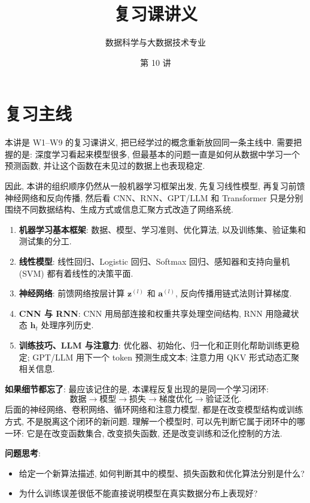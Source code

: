 \documentclass{../nndlcourse}
\begin{document}
\title{复习课讲义}
\author{数据科学与大数据技术专业}
\date{第 10 讲}
\maketitle

\section{复习主线}

本讲是 W1--W9 的复习课讲义, 把已经学过的概念重新放回同一条主线中. 需要把握的是: 深度学习看起来模型很多, 但最基本的问题一直是如何从数据中学习一个预测函数, 并让这个函数在未见过的数据上也表现稳定.

因此, 本讲的组织顺序仍然从一般机器学习框架出发, 先复习线性模型, 再复习前馈神经网络和反向传播, 然后看 CNN、RNN、GPT/LLM 和 Transformer 只是分别围绕不同数据结构、生成方式或信息汇聚方式改造了网络系统.  

\begin{enumerate}
    \item \textbf{机器学习基本框架}: 数据、模型、学习准则、优化算法, 以及训练集、验证集和测试集的分工.
    \item \textbf{线性模型}: 线性回归、Logistic 回归、Softmax 回归、感知器和支持向量机 (SVM) 都有着线性的决策平面.
    \item \textbf{神经网络}: 前馈网络按层计算 $\boldsymbol{z}^{(l)}$ 和 $\boldsymbol{a}^{(l)}$, 反向传播用链式法则计算梯度.
    \item \textbf{CNN 与 RNN}: CNN 用局部连接和权重共享处理空间结构, RNN 用隐藏状态 $\boldsymbol{h}_t$ 处理序列历史.
    \item \textbf{训练技巧、LLM 与注意力}: 优化器、初始化、归一化和正则化帮助训练更稳定; GPT/LLM 用下一个 token 预测生成文本; 注意力用 QKV 形式动态汇聚相关信息.
\end{enumerate}

\textbf{如果细节都忘了}: 最应该记住的是, 本课程反复出现的是同一个学习闭环:
\[
    \text{数据} \rightarrow \text{模型} \rightarrow \text{损失} \rightarrow \text{梯度优化} \rightarrow \text{验证泛化}.
\]
后面的神经网络、卷积网络、循环网络和注意力模型, 都是在改变模型结构或训练方式, 不是脱离这个闭环的新问题. 理解一个模型时, 可以先判断它属于闭环中的哪一环: 它是在改变函数集合, 改变损失函数, 还是改变训练和泛化控制的方法.

\textbf{问题思考}:
\begin{itemize}
    \item 给定一个新算法描述, 如何判断其中的模型、损失函数和优化算法分别是什么?
    \item 为什么训练误差很低不能直接说明模型在真实数据分布上表现好?
\end{itemize}
\end{document}
